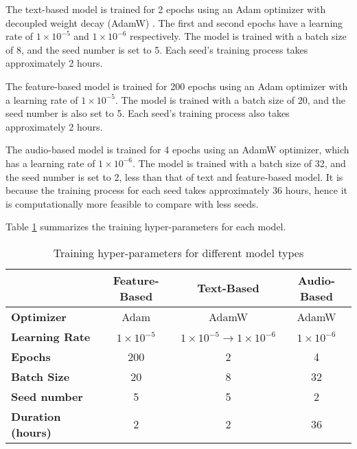 The text-based model is trained for 2 epochs using an Adam optimizer with decoupled weight decay (AdamW) . The first and second epochs have a learning rate of $1 \times 10^{-5}$ and $1 \times 10^{-6}$ respectively. The model is trained with a batch size of 8, and the seed number is set to 5. Each seed's training process takes approximately 2 hours.

The feature-based model is trained for 200 epochs using an Adam optimizer with a learning rate of $1 \times 10^{-5}$. The model is trained with a batch size of 20, and the seed number is also set to 5. Each seed's training process also takes approximately 2 hours.

The audio-based model is trained for 4 epochs using an AdamW optimizer, which has a learning rate of $1 \times 10^{-6}$. The model is trained with a batch size of 32, and the seed number is set to 2, less than that of text and feature-based model. It is because the training process for each seed takes approximately 36 hours, hence it is computationally more feasible to compare with less seeds.


Table \ref{tab:training_hyper_param} summarizes the training hyper-parameters for each model.
\begin{table}[H]
    \centering
    \begin{tabular}{|l|c|c|c|}
        \hline
                                  & \textbf{Feature-Based} & \textbf{Text-Based}                             & \textbf{Audio-Based} \\ \hline
        \textbf{Optimizer}        & Adam                   & AdamW                                           & AdamW                \\ \hline
        \textbf{Learning Rate}    & $1 \times 10^{-5}$     & $1 \times 10^{-5} \rightarrow 1 \times 10^{-6}$ & $1 \times 10^{-6}$   \\ \hline
        \textbf{Epochs}           & 200                    & 2                                               & 4                    \\ \hline
        \textbf{Batch Size}       & 20                     & 8                                               & 32                   \\ \hline
        \textbf{Seed number}      & 5                      & 5                                               & 2                    \\ \hline
        \textbf{Duration (hours)} & 2                      & 2                                               & 36                   \\ \hline
    \end{tabular}
    \caption{Training hyper-parameters for different model types}
    \label{tab:training_hyper_param}
\end{table}


